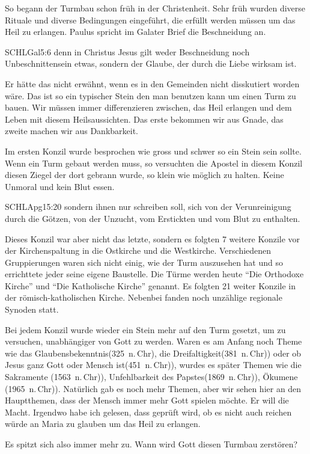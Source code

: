 \documentclass[14pt]{../../inc/mybib}
\newenvironment{block}[1][]{%
  \vspace{1.5em}%
  \noindent\textbf{#1}\par%
  \vspace{0.0em}%
}{%
  \vspace{1em}%
}
\begin{document}
\begin{block}
    So begann der Turmbau schon früh in der Christenheit. Sehr früh wurden diverse Rituale und diverse Bedingungen eingeführt, die erfüllt werden müssen um das Heil zu erlangen. 
    Paulus spricht im Galater Brief die Beschneidung an.
    \begin{bibelbox}{SCHL}{Gal}{5:6}
        denn in Christus Jesus gilt weder Beschneidung noch Unbeschnittensein etwas, sondern der Glaube, der durch die Liebe wirksam ist.
    \end{bibelbox}
    Er hätte das nicht erwähnt, wenn es in den Gemeinden nicht disskutiert worden wäre. Das ist so ein typischer Stein den man benutzen kann um einen Turm zu bauen. Wir müssen immer differenzieren zwischen, das Heil erlangen und dem Leben mit diesem Heilsaussichten. Das erste bekommen wir aus Gnade, das zweite machen wir aus Dankbarkeit.

    Im ersten Konzil wurde besprochen wie gross und schwer so ein Stein sein sollte. Wenn ein Turm gebaut werden muss, so versuchten die Apostel in diesem Konzil diesen Ziegel der dort gebrann wurde, so klein wie möglich zu halten. Keine Unmoral und kein Blut essen. 
    \begin{bibelbox}{SCHL}{Apg}{15:20}
        sondern ihnen nur schreiben soll, sich von der Verunreinigung durch die Götzen, von der Unzucht, vom Erstickten und vom Blut zu enthalten.
    \end{bibelbox}
    Dieses Konzil war aber nicht das letzte, sondern es folgten 7 weitere Konzile vor der Kirchenspaltung in die Ostkirche und die Westkirche. Verschiedenen Gruppierungen waren sich nicht einig, wie der Turm auszusehen hat und so errichttete jeder seine eigene Baustelle. Die Türme werden heute \enquote{Die Orthodoxe Kirche} und \enquote{Die Katholische Kirche} genannt. Es folgten 21 weiter Konzile in der römisch-katholischen Kirche. Nebenbei fanden noch unzählige regionale Synoden statt.
    
    Bei jedem Konzil wurde wieder ein Stein mehr auf den Turm gesetzt, um zu versuchen, unabhängiger von Gott zu werden. Waren es am Anfang noch Theme wie das Glaubensbekenntnis(325~n.\,Chr), die Dreifaltigkeit(381~n.\,Chr)) oder ob Jesus ganz Gott oder Mensch ist(451~n.\,Chr)), wurdes es später Themen wie die Sakramente (1563~n.\,Chr)), Unfehlbarkeit des Papstes(1869~n.\,Chr)), Ökumene (1965~n.\,Chr)). Natürlich gab es noch mehr Themen, aber wir sehen hier an den Hauptthemen, dass der Mensch immer mehr Gott spielen möchte. Er will die Macht.
    Irgendwo habe ich gelesen, dass geprüft wird, ob es nicht auch reichen würde an Maria zu glauben um das Heil zu erlangen.
    
    Es spitzt sich also immer mehr zu. Wann wird Gott diesen Turmbau zerstören?
\end{block}
\end{document}
